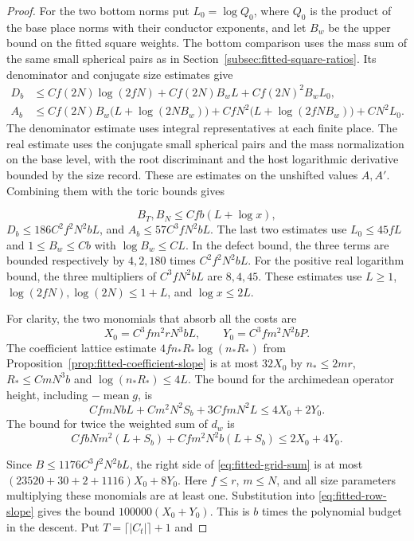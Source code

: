 \begin{proof}
For the two bottom norms put \(L_0=\log Q_0\), where
\(Q_0\) is the product of the base place norms with their
conductor exponents, and let \(B_w\) be the upper bound on the
fitted square weights. The bottom comparison uses the mass
sum of the same small spherical pairs as in
Section~\ref{subsec:fitted-square-ratios}. Its denominator
and conjugate size estimates give
\begin{align*}
 D_b &\le C f(2N)\log(2fN)
    +C f(2N)B_w L+C f(2N)^2 B_w L_0,\\
 A_b &\le C f(2N)B_w\bigl(L+\log(2NB_w)\bigr)
    +C fN^2\bigl(L+\log(2fNB_w)\bigr)+C N^2 L_0 .
\end{align*}
The denominator estimate uses integral representatives
at each finite place. The real estimate uses the conjugate
small spherical pairs and the mass normalization on the base
level, with the root discriminant and the host logarithmic
derivative bounded by the size record. These are estimates
on the unshifted values \(A,A'\).
\label{cor:fitted-row-height-4}
Combining them with the toric bounds gives

\[
  B_T,B_N\le Cf b(L+\log x),
\]
\(D_b\le186C^2 f^2N^2 bL\), and
\(A_b\le57C^3 fN^2 bL\). The last two estimates use
\(L_0\le45fL\) and \(1\le B_w\le Cb\) with
\(\log B_w\le CL\). In the defect bound, the three terms
are bounded respectively by \(4,2,180\) times
\(C^2 f^2N^2 bL\). For the positive real logarithm bound,
the three multipliers of \(C^3 fN^2 bL\) are \(8,4,45\).
These estimates use \(L\ge1\),
\(\log(2fN),\log(2N)\le 1+L\), and
\(\log x\le2L\).

For clarity, the two monomials that absorb all the
costs are
\[
 X_0=C^3 f m^2rN^3 bL,\qquad Y_0=C^3 f m^2N^2 bP .
\]
The coefficient lattice estimate \(4f n_*R_*\log(n_*R_*)\)
from Proposition~\ref{prop:fitted-coefficient-slope} is at most \(32X_0\) by
\(n_*\le2mr\), \(R_*\le CmN^3 b\) and
\(\log(n_*R_*)\le4L\).
The bound for the archimedean operator height, including
\(-\operatorname{mean}g\), is
\[
 Cf mN bL + C m^2N^2 S_b + 3Cf mN^2 L\le4X_0+2Y_0.
\]
The bound for twice the weighted sum of \(d_w\) is
\[
 Cf bNm^2(L+S_b)+Cf m^2N^2b(L+S_b)
 \le 2X_0+4Y_0.
\]

Since \(B\le1176C^3 f^2N^2bL\), the right side of
\eqref{eq:fitted-grid-sum} is at most
\((23520+30+2+1116)X_0+8Y_0\).
Here \(f\le r\), \(m\le N\), and all size parameters
multiplying these monomials are at least one.
Substitution into \eqref{eq:fitted-row-slope} gives the bound
\(100000(X_0+Y_0)\). This is \(b\) times the polynomial budget
in the descent. Put \(T=\lceil|C_t|\rceil+1\) and


\end{proof}
